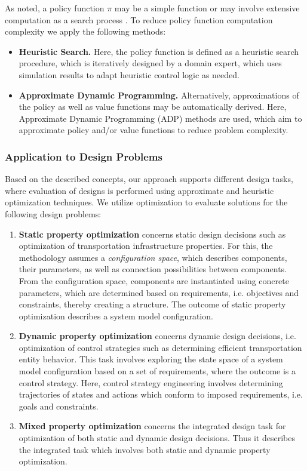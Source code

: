 \documentclass[a4paper,twoside]{article}
\begin{document}
As noted, a policy function $\pi$ may be a simple function or may involve extensive computation as a search process \cite{mania2018simple}. To reduce policy function computation complexity we apply the following methods:
\begin{itemize}
	\item \textbf{Heuristic Search.} Here, the policy function is defined as a heuristic search procedure, which is iteratively designed by a domain expert, which uses simulation results to adapt heuristic control logic as needed. 
	\item \textbf{Approximate Dynamic Programming.} Alternatively, approximations of the policy as well as value functions may be automatically derived. Here, Approximate Dynamic Programming (ADP) methods \cite{powell_approximate_2007,ascher_hackenberg_albayrak_2023} are used, which aim to approximate policy and/or value functions to reduce problem complexity. 
\end{itemize}

	\subsubsection{Application to Design Problems}
	Based on the described concepts, our approach supports different design tasks, where evaluation of designs is performed using approximate and heuristic optimization techniques. We utilize optimization to evaluate solutions for the following design problems:

	\begin{enumerate}
		\item \textbf{Static property optimization} concerns static design decisions such as optimization of transportation infrastructure properties. For this, the methodology assumes a \textit{configuration space}, which describes components, their parameters, as well as connection possibilities between components. From the configuration space, components are instantiated using concrete parameters, which are determined based on requirements, i.e. objectives and constraints, thereby creating a structure. The outcome of static property  optimization describes a system model configuration.
		\item \textbf{Dynamic property optimization} concerns dynamic design decisions, i.e. optimization of control strategies such as determining efficient transportation entity behavior. This task involves exploring the state space of a system model configuration based on a set of requirements, where the outcome is a control strategy. Here, control strategy engineering involves determining trajectories of states and actions which conform to imposed requirements, i.e. goals and constraints. 
		\item \textbf{Mixed property optimization} concerns the integrated design task for optimization of both static and dynamic design decisions. Thus it describes the integrated task which involves both static and dynamic property optimization.
	\end{enumerate}
	
\end{document}
